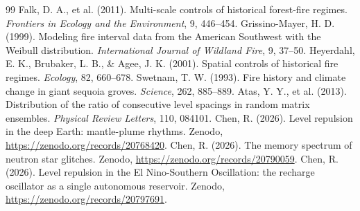 \documentclass[12pt,a4paper]{article}
\begin{document}
\begin{thebibliography}{99}
\small
{} Falk, D. A., et al. (2011). Multi-scale controls of historical forest-fire regimes. \emph{Frontiers in Ecology and the Environment}, 9, 446--454.
 Grissino-Mayer, H. D. (1999). Modeling fire interval data from the American Southwest with the Weibull distribution. \emph{International Journal of Wildland Fire}, 9, 37--50.
 Heyerdahl, E. K., Brubaker, L. B., \& Agee, J. K. (2001). Spatial controls of historical fire regimes. \emph{Ecology}, 82, 660--678.
 Swetnam, T. W. (1993). Fire history and climate change in giant sequoia groves. \emph{Science}, 262, 885--889.
 Atas, Y. Y., et al. (2013). Distribution of the ratio of consecutive level spacings in random matrix ensembles. \emph{Physical Review Letters}, 110, 084101.
 Chen, R. (2026). Level repulsion in the deep Earth: mantle-plume rhythms. Zenodo, \url{https://zenodo.org/records/20768420}.
 Chen, R. (2026). The memory spectrum of neutron star glitches. Zenodo, \url{https://zenodo.org/records/20790059}.
 Chen, R. (2026). Level repulsion in the El Nino-Southern Oscillation: the recharge oscillator as a single autonomous reservoir. Zenodo, \url{https://zenodo.org/records/20797691}.
\end{thebibliography}
\end{document}

